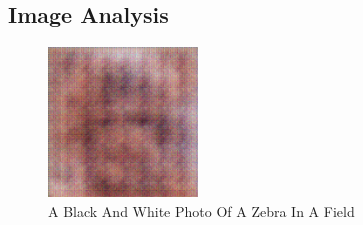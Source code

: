 \documentclass{article}%
\begin{document}
%
\subsection{Image Analysis}%
\label{subsec:ImageAnalysis}%


\begin{figure}[h!]%
\centering%
\includegraphics[width=150px]{500_fake_images/samples_5_263.png}%
\caption{A Black And White Photo Of A Zebra In A Field}%
\end{figure}

%
\end{document}
